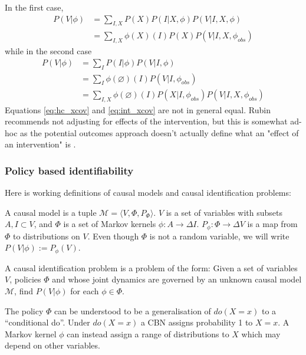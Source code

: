 In the first case,
\begin{align}
    P(V|\phi)&=\sum_{I,X} P(X) P(I|X,\phi) P(V|I,X,\phi)\\
             &=\sum_{I,X} \phi(X)(I) P(X)  P(V|I,X,\phi_{obs}) \label{eq:hc_xcov}
\end{align}
while in the second case
\begin{align}
    P(V|\phi)&=\sum_I P(I|\phi) P(V|I,\phi) \\
             &=\sum_I \phi(\varnothing)(I) P(V|I,\phi_{obs})\\
             &=\sum_{I,X} \phi(\varnothing)(I) P(X|I,\phi_{obs}) P(V|I,X,\phi_{obs}) \label{eq:int_xcov}
\end{align}
Equations \ref{eq:hc_xcov} and \ref{eq:int_xcov} are not in general equal. Rubin recommends not adjusting for effects of the intervention, but this is somewhat ad-hoc as the potential outcomes approach doesn't actually define what an "effect of an intervention" is \cite{rubin_causal_2005}.

\subsubsection{Policy based identifiability}

Here is working definitions of causal models and causal identification problems:

\begin{definition}
A causal model is a tuple $\mathcal{M} = \langle V, \Phi, P_\Phi \rangle$. $V$ is a set of variables with subsets $A, I\subset V$, and $\Phi$ is a set of Markov kernels $\phi:A\to \Delta I$. $P_\phi : \Phi\to \Delta V$ is a map from $\Phi$ to distributions on $V$. Even though $\Phi$ is not a random variable, we will write $P(V|\phi) := P_\phi(V)$.
\end{definition}

\begin{definition}\label{def:causal_ident_prob}
A causal identification problem is a problem of  the form: Given a set of variables $V$, policies $\Phi$ and  whose joint dynamics are governed by an unknown causal model $\mathcal{M}$, find $P(V|\phi)$ for each $\phi\in \Phi$.
\end{definition}

The policy $\Phi$ can be understood to be a generalisation of $do(X=x)$ to a ``conditional do''. Under $do(X=x)$ a CBN assigns probability 1 to $X=x$. A Markov kernel $\phi$ can instead assign a range of distributions to $X$ which may depend on other variables.

